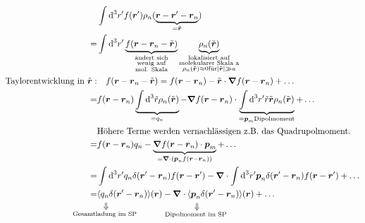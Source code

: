 \documentclass[titlepage,11pt,a4paper,ngerman]{report}
\newcommand{\tx}[1]{\textrm{#1}}
\newcommand{\ub}[1]{\underbrace{#1}}
\newcommand{\dd}{\tx{d}}
\newcommand{\custo}[3]{\underset{\scriptstyle\overset{\mkern4mu\rotatebox{-90}{$\,#1$}}{#3}}{#2}}
\renewcommand{\vec}[1]{\boldsymbol{#1}}
\newcommand{\vabla}{\boldsymbol{\nabla}}
\begin{document}
\begin{align*}
&\int \dd^3 r' f(\vec{r}') \rho_n (\ub{\vec{r} - \vec{r}' - \vec{r}_n}_{= \tilde{\vec{r}}})\\
=& \int \dd ^3 r' \ub{f(\vec{r} - \vec{r}_n - \tilde{\vec{r}})}_{\substack{\tx{ändert sich} \\ \tx{wenig auf} \\ \tx{mol. Skala}}} \ub{\rho_n(\tilde{\vec{r}})}_{\substack{\tx{lokalisiert auf} \\ \tx{molekularer Skala a} \\ \rho_n(\tilde{\vec{r}})\approx 0 \tx{für} |\tilde{\vec{r}}| \gg a }}\\
\tx{Taylorentwicklung in } \tilde{\vec{r}}: &\quad f(\vec{r} - \vec{r}_n - \tilde{\vec{r}}) = f(\vec{r} - \vec{r}_n) - \tilde{\vec{r}} \cdot \vabla f(\vec{r} - \vec{r}_n) + \dots \\
=& f(\vec{r} - \vec{r}_n) \ub{\int \dd^3 \tilde{r} \rho_n(\tilde{\vec{r}})}_{= q_n} - \vabla f(\vec{r} - \vec{r}_n) \cdot \ub{\int \dd ^3 r' \tilde{r} \tilde{\vec{r}} \rho_n(\tilde{\vec{r}})}_{= \vec{p}_m \tx{Dipolmoment}} + \dots \\
& \tx{Höhere Terme werden vernachlässigen z.B. das Quadrupolmoment.} \\
=& f(\vec{r} - \vec{r}_n) q_n - \ub{\vabla f(\vec{r} - \vec{r}_n) \cdot \vec{p}_m}_{= \vabla \cdot (\vec{p}_n f(\vec{r} - \vec{r}_n))} + \dots \\
=& \int \dd^3r' q_n \delta(\vec{r}' - \vec{r}_n) f(\vec{r} - \vec{r}') - \vabla \cdot \int \dd^3r' \vec{p}_n \delta(\vec{r}' - \vec{r}_n) f(\vec{r} - \vec{r}') + \dots \\
=& \langle \custo{\Rightarrow}{q_n}{\mathclap{\tx{Gesamtladung im SP}}} \delta(\vec{r}' - \vec{r}_n) \rangle (\vec{r}) - \vabla \cdot \langle \custo{\Rightarrow}{\vec{p}_n}{\mathclap{\tx{Dipolmoment im SP}}} \delta(\vec{r}' - \vec{r}_n) \rangle (\vec{r}) + \dots
\end{align*}


\end{document}
